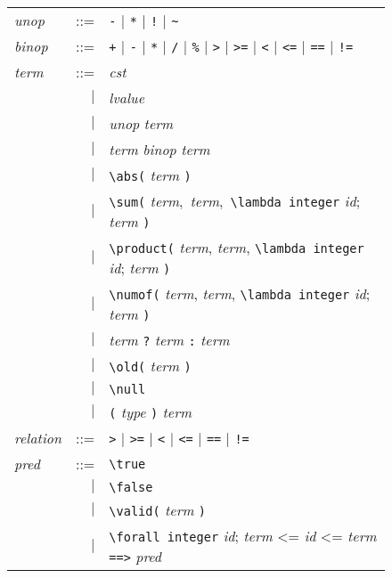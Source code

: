 \begin{figure}[tb]
  \begin{tabular}{lrl}
    \textit{unop} & ::= & \lstinline'-' $\mid$ \lstinline'*' $\mid$
    \lstinline'!' $\mid$ \lstinline'~' \\
    \textit{binop} & ::= & \lstinline'+' $\mid$ \lstinline'-' $\mid$
    \lstinline'*' $\mid$ \lstinline'/' $\mid$ \lstinline'%' $\mid$
    \lstinline'>' $\mid$ \lstinline'>=' $\mid$ \lstinline'<' $\mid$
    \lstinline'<=' $\mid$ \lstinline'==' $\mid$ \lstinline'!=' \\
    \textit{term} & ::= & \textit{cst} \\
    & $\mid$ & \textit{lvalue} \\
    & $\mid$ & \textit{unop} \textit{term} \\
    & $\mid$ & \textit{term} \textit{binop} \textit{term} \\
    & $\mid$ & \lstinline'\abs(' \textit{term} \lstinline')' \\
    & $\mid$ & \lstinline'\sum(' \textit{term}$,$ \textit{term}$,$
    \lstinline'\lambda integer' \textit{id}$;$ \textit{term} \lstinline')' \\
    & $\mid$ & \lstinline'\product(' \textit{term}, \textit{term},
    \lstinline'\lambda integer' \textit{id}; \textit{term} \lstinline')' \\
    & $\mid$ & \lstinline'\numof(' \textit{term}, \textit{term},
    \lstinline'\lambda integer' \textit{id}; \textit{term} \lstinline')' \\
    & $\mid$ & \textit{term} \texttt{?} \textit{term} \texttt{:} \textit{term}\\
    & $\mid$ & \lstinline'\old(' \textit{term} \lstinline')' \\
    & $\mid$ & \lstinline'\null' \\
    & $\mid$ & \lstinline'(' \textit{type} \lstinline')' \textit{term} \\
    \textit{relation} & ::= & \lstinline'>' $\mid$ \lstinline'>=' $\mid$
    \lstinline'<' $\mid$ \lstinline'<=' $\mid$ \lstinline'==' $\mid$
    \lstinline'!=' \\
    \textit{pred} & ::= & \lstinline'\true' \\
    & $\mid$ & \lstinline'\false' \\
    & $\mid$ & \lstinline'\valid(' \textit{term} \lstinline')' \\
    & $\mid$ & \lstinline'\forall integer' \textit{id};
    \textit{term} <= \textit{id} <= \textit{term}
    \lstinline'==>' \textit{pred} \\

\end{tabular}
\end{figure}
